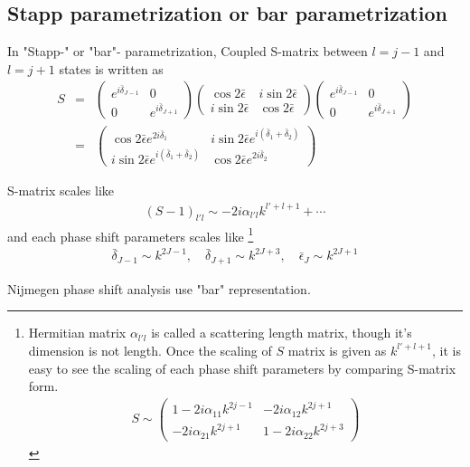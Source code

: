 \documentclass[10pt]{book}
\newcommand{\bea}{\begin{eqnarray}}
\newcommand{\eea}{\end{eqnarray}}
\newcommand{\no}{\nonumber \\}
\begin{document}
\subsection{Stapp parametrization or bar parametrization}
In "Stapp-" or "bar"- parametrization, 
Coupled S-matrix between $l=j-1$ and $l=j+1$ states
is written as
\bea
S&=&\left(
\begin{array}{cc}
e^{i\bar{\delta}_{J-1}} & 0\\ 0 & e^{i\bar{\delta}_{J+1}}
\end{array}
\right)
\left(
\begin{array}{cc}
\cos2\bar{\epsilon} & i\sin2\bar{\epsilon} \\
i\sin2\bar{\epsilon} & \cos2\bar{\epsilon}
\end{array}
\right)
\left(
\begin{array}{cc}
e^{i\bar{\delta}_{J-1}} & 0\\ 0 & e^{i\bar{\delta}_{J+1}}
\end{array}
\right) \no
&=&\left(
\begin{array}{cc}
\cos 2\bar{\epsilon} e^{2i\bar{\delta}_1} & i\sin 2\bar{\epsilon} e^{i(\bar{\delta}_1+\bar{\delta}_2)} \\
i\sin 2\bar{\epsilon} e^{i(\bar{\delta}_1+\bar{\delta}_2)} & \cos 2\bar{\epsilon} e^{2i\bar{\delta}_2}
\end{array}
\right)
\eea

S-matrix scales like
\bea
(S-1)_{l'l}\sim -2i\alpha_{l'l} k^{l'+l+1}+\cdots
\eea
and each phase shift parameters scales like
\footnote{
Hermitian matrix $\alpha_{l'l}$ is called a scattering length matrix,
though it's dimension is not length. 
Once the scaling of $S$ matrix is given as $k^{l'+l+1}$,
it is easy to see the scaling of each phase shift parameters
by comparing S-matrix form.
\bea
S\sim\left( \begin{array}{cc}
1-2i\alpha_{11}k^{2j-1} & -2i\alpha_{12} k^{2j+1}\\
-2i\alpha_{21}k^{2j+1} & 1-2i\alpha_{22} k^{2j+3}
\end{array}
\right)
\eea
} 
\bea
\bar{\delta}_{J-1}\sim k^{2J-1},\quad
\bar{\delta}_{J+1}\sim k^{2J+3},\quad
\bar{\epsilon}_J\sim k^{2J+1}
\eea

Nijmegen phase shift analysis use "bar" representation.
\end{document}
